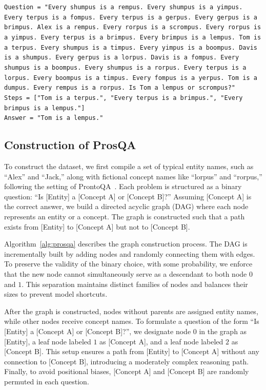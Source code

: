 \documentclass[]{fairmeta}
\begin{document}
\begin{tcolorbox}[title=ProsQA, colback=white]
\texttt{Question = "Every shumpus is a rempus. Every shumpus is a yimpus. Every terpus is a fompus. Every terpus is a gerpus. Every gerpus is a brimpus. Alex is a rempus. Every rorpus is a scrompus. Every rorpus is a yimpus. Every terpus is a brimpus. Every brimpus is a lempus. Tom is a terpus. Every shumpus is a timpus. Every yimpus is a boompus. Davis is a shumpus. Every gerpus is a lorpus. Davis is a fompus. Every shumpus is a boompus. Every shumpus is a rorpus. Every terpus is a lorpus. Every boompus is a timpus. Every fompus is a yerpus. Tom is a dumpus. Every rempus is a rorpus. Is Tom a lempus or scrompus?" \\ Steps = ["Tom is a terpus.", "Every terpus is a brimpus.", "Every brimpus is a lempus."]\\
Answer = "Tom is a lempus."
}
\end{tcolorbox}

\subsection{Construction of ProsQA}

To construct the dataset, we first compile a set of typical entity names, such as “Alex” and “Jack,” along with fictional concept names like “lorpus” and “rorpus,” following the setting of ProntoQA~\citep{saparov2022language}. Each problem is structured as a binary question: “Is [Entity] a [Concept A] or [Concept B]?” Assuming [Concept A] is the correct answer, we build a directed acyclic graph (DAG) where each node represents an entity or a concept. The graph is constructed such that a path exists from [Entity] to [Concept A] but not to [Concept B].

Algorithm~\ref{alg:prosqa} describes the graph construction process. The DAG is incrementally built by adding nodes and randomly connecting them with edges. To preserve the validity of the binary choice, with some probability, we enforce that the new node cannot simultaneously serve as a descendant to both node $0$ and $1$. This separation maintains distinct families of nodes and balances their sizes to prevent model shortcuts.

After the graph is constructed, nodes without parents are assigned entity names, while other nodes receive concept names. To formulate a question of the form “Is [Entity] a [Concept A] or [Concept B]?”, we designate node $0$ in the graph as [Entity], a leaf node labeled $1$ as [Concept A], and a leaf node labeled $2$ as [Concept B]. This setup ensures a path from [Entity] to [Concept A] without any connection to [Concept B], introducing a moderately complex reasoning path. Finally, to avoid positional biases, [Concept A] and [Concept B] are randomly permuted in each question.
\end{document}
